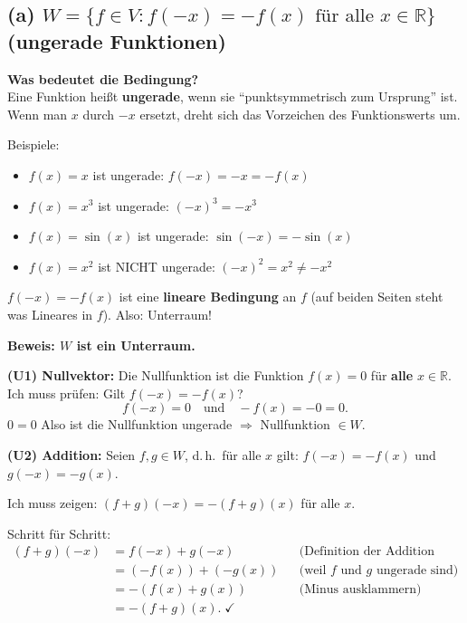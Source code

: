 \documentclass[a4paper,12pt]{article}
\begin{document}
\subsection*{(a) \quad $W = \{f \in V : f(-x) = -f(x) \text{ f\"ur alle } x \in \mathbb{R}\}$ (ungerade Funktionen)}

\textbf{Was bedeutet die Bedingung?}\\
Eine Funktion hei\ss t \textbf{ungerade}, wenn sie ``punktsymmetrisch zum Ursprung'' ist. Wenn man $x$ durch $-x$ ersetzt, dreht sich das Vorzeichen des Funktionswerts um.

Beispiele:
\begin{itemize}
    \item $f(x) = x$ ist ungerade: $f(-x) = -x = -f(x)$ \checkmark
    \item $f(x) = x^3$ ist ungerade: $(-x)^3 = -x^3$ \checkmark
    \item $f(x) = \sin(x)$ ist ungerade: $\sin(-x) = -\sin(x)$ \checkmark
    \item $f(x) = x^2$ ist NICHT ungerade: $(-x)^2 = x^2 \neq -x^2$
\end{itemize}

\begin{merkbox}
$f(-x) = -f(x)$ ist eine \textbf{lineare Bedingung} an $f$ (auf beiden Seiten steht was Lineares in $f$). Also: Unterraum!
\end{merkbox}

\textbf{Beweis: $W$ ist ein Unterraum.}

\medskip
\textbf{(U1) Nullvektor:}
Die Nullfunktion ist die Funktion $f(x) = 0$ f\"ur \textbf{alle} $x \in \mathbb{R}$.
Ich muss pr\"ufen: Gilt $f(-x) = -f(x)$?
\[
f(-x) = 0 \quad \text{und} \quad -f(x) = -0 = 0.
\]
$0 = 0$ \checkmark \quad Also ist die Nullfunktion ungerade $\Rightarrow$ Nullfunktion $\in W$.

\medskip
\textbf{(U2) Addition:}
Seien $f, g \in W$, d.\,h.\ f\"ur alle $x$ gilt: $f(-x) = -f(x)$ und $g(-x) = -g(x)$.

Ich muss zeigen: $(f+g)(-x) = -(f+g)(x)$ f\"ur alle $x$.

Schritt f\"ur Schritt:
\begin{align*}
(f+g)(-x) &= f(-x) + g(-x)
    && \text{(Definition der Addition von Funktionen)} \\
  &= (-f(x)) + (-g(x))
    && \text{(weil $f$ und $g$ ungerade sind)} \\
  &= -(f(x) + g(x))
    && \text{(Minus ausklammern)} \\
  &= -(f+g)(x). \;\checkmark
\end{align*}
\end{document}
